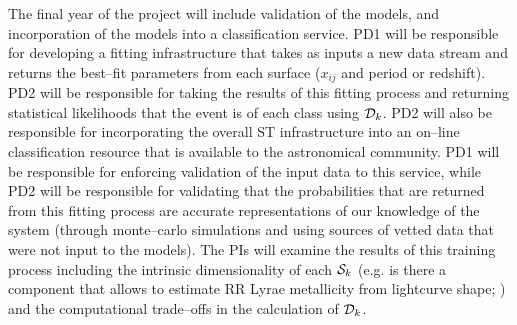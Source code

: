  \smallskip

The final year of the project will include validation of the models, and
incorporation of the models into a classification service.  PD1 will be
responsible for developing a fitting infrastructure that takes as inputs a new
data stream and returns the best--fit parameters from each surface ($x_{ij}$ and
period or redshift).  PD2 will be responsible for taking the results of this
fitting process and returning statistical likelihoods that the event is of each
class using ${\cal D}_k$.  PD2 will also be responsible for incorporating the
overall ST infrastructure into an on--line classification resource that is
available to the astronomical community. PD1 will be responsible for enforcing
validation of the input data to this service, while PD2 will be responsible for
validating that the probabilities that are returned from this fitting process
are accurate representations of our knowledge of the system (through
monte--carlo simulations and using sources of vetted data that were not input to
the models). The PIs will examine the results of this training process including
the intrinsic dimensionality of each ${\cal S}_k$ (e.g. is there a component
that allows to estimate RR Lyrae metallicity from lightcurve shape;
\citealt{1996A&A...312..111J}) and the computational trade--offs in the
calculation of  ${\cal D}_k$.
